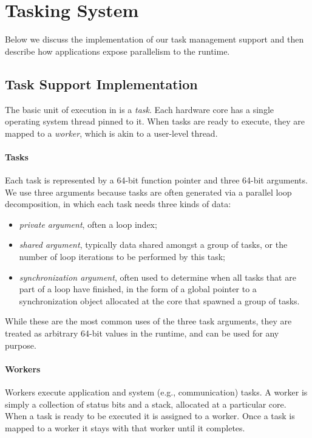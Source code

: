 \section{Tasking System}

Below we discuss the implementation of our task management support and then
describe how applications expose parallelism to the \Grappa runtime.

\subsection{Task Support Implementation}

The basic unit of execution in \Grappa is a {\em task}. Each hardware core has
a single operating system thread pinned to it. When tasks are ready to
execute, they are mapped to a {\em worker}, which is akin to a user-level
thread. %

\paragraph{Tasks} Each task is represented by a 64-bit function pointer and
three 64-bit arguments. We use three arguments because tasks are often
generated via a parallel loop decomposition, in which each task needs three
kinds of data:

\begin{itemize}
\item {\it private argument}, often a loop index; 

\item {\it shared argument}, typically data shared amongst a group of
tasks, or the number of loop iterations to be performed by this task;

\item {\it synchronization argument}, often used to determine when all
tasks that are part of a loop have finished, in the form of a global pointer
to a synchronization object allocated at the core that spawned a group of
tasks.
\end{itemize}

While these are the most common uses of the three task arguments, they are
treated as arbitrary 64-bit values in the runtime, and can be used for any
purpose.

\paragraph{Workers} Workers execute application and system (e.g.,
communication) tasks. A worker is simply a collection of status bits and a
stack, allocated at a particular core. When a task is ready to be executed it
is assigned to a worker. Once a task is mapped to a worker it stays with that
worker until it completes.

